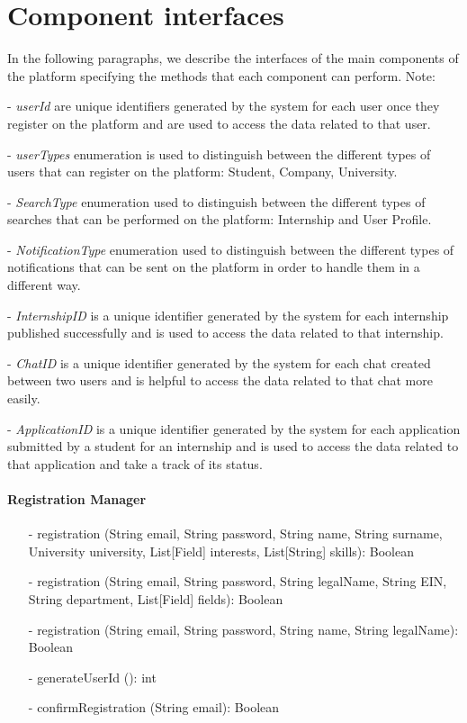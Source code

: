 \section{Component interfaces}\label{sec:component interfaces}
In the following paragraphs, we describe the interfaces of the main components of the platform specifying the methods that each component can perform.
Note: 

- \textit{userId} are unique identifiers generated by the system for each user once they register on the platform and are used to access the data related to 
that user.

- \textit{userTypes} enumeration is used to distinguish between the different types of users that can register on the platform: Student, Company, University.

- \textit{SearchType} enumeration used to distinguish between the different types of searches that can be performed on the platform: Internship and User Profile.

- \textit{NotificationType} enumeration used to distinguish between the different types of notifications that can be sent on the platform in order to handle 
them in a different way.

- \textit{InternshipID} is a unique identifier generated by the system for each internship published successfully and is used to access the data related to 
that internship.

- \textit{ChatID} is a unique identifier generated by the system for each chat created between two users and is helpful to access the data related to that 
chat more easily.

- \textit{ApplicationID} is a unique identifier generated by the system for each application submitted by a student for an internship and is used to access 
the data related to that application and take a track of its status.
\paragraph{Registration Manager}
\begin{itemize}
    \item[-] registration (String email, String password, String name, String surname, University university, List[Field] interests, List[String] skills): Boolean
    \item[-] registration (String email, String password, String legalName, String EIN, String department, List[Field] fields): Boolean
    \item[-] registration (String email, String password, String name, String legalName): Boolean
    \item[-] generateUserId (): int
    \item[-] confirmRegistration (String email): Boolean 
\end{itemize}

